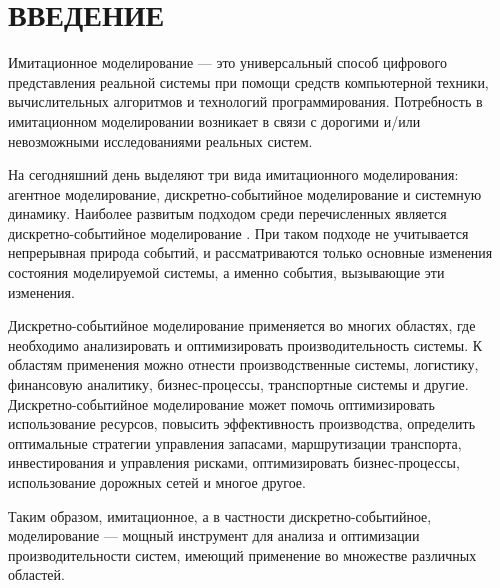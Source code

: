 \chapter*{ВВЕДЕНИЕ}

Имитационное моделирование --- это универсальный способ цифрового
представления реальной системы при помощи средств компьютерной техники, вычислительных алгоритмов и технологий программирования. Потребность в имитационном моделировании возникает в связи с дорогими и/или невозможными исследованиями реальных систем. 

На сегодняшний день выделяют три вида имитационного моделирования: агентное моделирование, дискретно-событийное моделирование и системную динамику.
Наиболее развитым подходом среди перечисленных является дискретно-событийное моделирование \cite{economic_system}. При таком подходе не учитывается непрерывная природа событий, и рассматриваются только основные изменения состояния моделируемой системы, а именно события, вызывающие эти изменения. 

Дискретно-событийное моделирование применяется во многих областях, где необходимо анализировать и оптимизировать производительность системы. К областям применения можно отнести производственные системы, логистику, финансовую аналитику, бизнес-процессы, транспортные системы и другие. Дискретно-событийное моделирование может помочь оптимизировать использование ресурсов, повысить эффективность производства, определить оптимальные стратегии управления запасами, маршрутизации транспорта, инвестирования и управления рисками, оптимизировать бизнес-процессы, использование дорожных сетей и многое другое.

Таким образом, имитационное, а в частности дискретно-событийное, моделирование --- мощный инструмент для анализа и оптимизации производительности систем, имеющий применение во множестве различных областей.